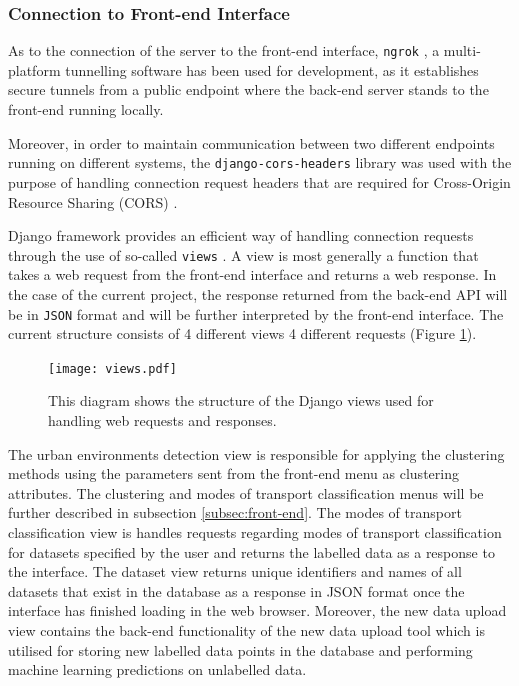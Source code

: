 \documentclass[bsc,frontabs,twoside,singlespacing,parskip,deptreport]{infthesis}     %
\begin{document}
\subsubsection*{Connection to Front-end Interface}

As to the connection of the server to the front-end interface, \texttt{ngrok} \cite{ngrok}, a multi-platform tunnelling software has been used for development, as it establishes secure tunnels from a public endpoint where the back-end server stands to the front-end running locally. 

Moreover, in order to maintain communication between two different endpoints running on different systems, the \texttt{django-cors-headers} \cite{django-cors} library was used with the purpose of handling connection request headers that are required for Cross-Origin Resource Sharing (CORS) \cite{cors}.

Django framework provides an efficient way of handling connection requests through the use of so-called \texttt{views} \cite{django-views}. A view is most generally a function that takes a web request from the front-end interface and returns a web response. In the case of the current project, the response returned from the back-end API will be in \texttt{JSON} format \cite{json} and will be further interpreted by the front-end interface. The current structure consists of 4 different views 4 different requests (Figure \ref{fig:views}).

\begin{figure}[h!]
  \center
  \texttt{[image: views.pdf]}
  \caption{This diagram shows the structure of the Django views used for handling web requests and responses.}
  \label{fig:views}
\end{figure}

The urban environments detection view is responsible for applying the clustering methods using the parameters sent from the front-end menu as clustering attributes. The clustering and modes of transport classification menus will be further described in subsection \ref{subsec:front-end}. The modes of transport classification view is handles requests regarding modes of transport classification for datasets specified by the user and returns the labelled data as a response to the interface. The dataset view returns unique identifiers and names of all datasets that exist in the database as a response in JSON format once the interface has finished loading in the web browser. Moreover, the new data upload view contains the back-end functionality of the new data upload tool which is utilised for storing new labelled data points in the database and performing machine learning predictions on unlabelled data.
\end{document}
